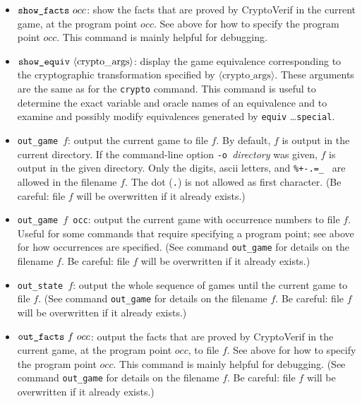\documentclass{article}
\newcommand{\nonterm}[1]{\langle\textrm{#1}\rangle}
\begin{document}
\begin{itemize}
\item $\texttt{show\string_facts}\ occ$: show the facts that are proved
by CryptoVerif in the current game, at the program point $occ$. 
See above for how to specify the program point $occ$.
This command is mainly helpful for debugging.

\item $\texttt{show\string_equiv}\ \nonterm{crypto\_args}$: display the
game equivalence corresponding to the cryptographic transformation
specified by $\nonterm{crypto\_args}$. These arguments are the same as
for the \texttt{crypto} command.
This command is useful to determine the exact variable and oracle
names of an equivalence and to examine and possibly modify equivalences
generated by \texttt{equiv} \dots \texttt{special}.

\item \texttt{out\string_game $f$}: output the current game to file $f$.
  By default, $f$ is output in the current directory. If the command-line
  option \texttt{-o }\textit{directory} was given, $f$ is output in the given
  directory. Only the digits, ascii letters, and \texttt{\%+-.=\string@\_\string~}
  are allowed in the filename $f$. The dot (\texttt{.}) is not allowed as first
  character.
  (Be careful: file $f$ will be overwritten if it already exists.)

\item \texttt{out\string_game $f$ occ}: output the current game with
  occurrence numbers to file $f$. Useful for some commands that require specifying a
  program point; see above for how occurrences are specified.
  (See command \texttt{out\string_game} for details on the filename $f$.
  Be careful: file $f$ will be overwritten if it already exists.)

\item \texttt{out\string_state $f$}: output the whole sequence
of games until the current game to file $f$.
(See command \texttt{out\string_game} for details on the filename $f$.
Be careful: file $f$ will be overwritten if it already exists.)

\item $\texttt{out\string_facts}\ f\ occ$: output the facts that are proved
  by CryptoVerif in the current game, at the program point $occ$,
  to file $f$. 
See above for how to specify the program point $occ$.
This command is mainly helpful for debugging.
(See command \texttt{out\string_game} for details on the filename $f$.
Be careful: file $f$ will be overwritten if it already exists.)


\end{itemize}
\end{document}
